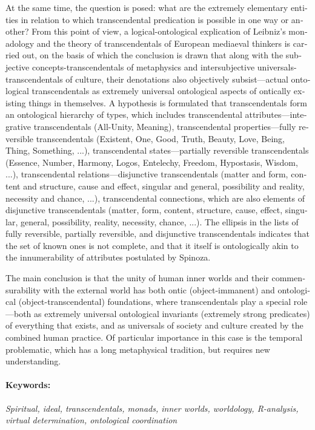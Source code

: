 \begin{english}
    At the same time, the question is posed: what are the extremely elementary entities in relation to which transcendental predication is possible in one way or another? From this point of view, a logical-ontological explication of Leibniz's monadology and the theory of transcendentals of European mediaeval thinkers is carried out, on the basis of which the conclusion is drawn that along with the subjective concepts-transcendentals of metaphysics and intersubjective universals-transcendentals of culture, their denotations also objectively subsist—actual ontological transcendentals as extremely universal ontological aspects of ontically existing things in themselves. A hypothesis is formulated that transcendentals form an ontological hierarchy of types, which includes transcendental attributes—integrative transcendentals (All-Unity, Meaning), transcendental properties—fully reversible transcendentals (Existent, One, Good, Truth, Beauty, Love, Being, Thing, Something, ...), transcendental states—partially reversible transcendentals (Essence, Number, Harmony, Logos, Entelechy, Freedom, Hypostasis, Wisdom, ...), transcendental relations—disjunctive transcendentals (matter and form, content and structure, cause and effect, singular and general, possibility and reality, necessity and chance, ...), transcendental connections, which are also elements of disjunctive transcendentals (matter, form, content, structure, cause, effect, singular, general, possibility, reality, necessity, chance, ...). The ellipsis in the lists of fully reversible, partially reversible, and disjunctive transcendentals indicates that the set of known ones is not complete, and that it itself is ontologically akin to the innumerability of attributes postulated by Spinoza.

    The main conclusion is that the unity of human inner worlds and their commensurability with the external world has both ontic (object-immanent) and ontological (object-transcendental) foundations, where transcendentals play a special role—both as extremely universal ontological invariants (extremely strong predicates) of everything that exists, and as universals of society and culture created by the combined human practice. Of particular importance in this case is the temporal problematic, which has a long metaphysical tradition, but requires new understanding.

    \paragraph{Keywords:} {\itshape Spiritual, ideal, transcendentals, monads, inner worlds, worldology, R-analysis, virtual determination, ontological coordination}
    \end{english}
